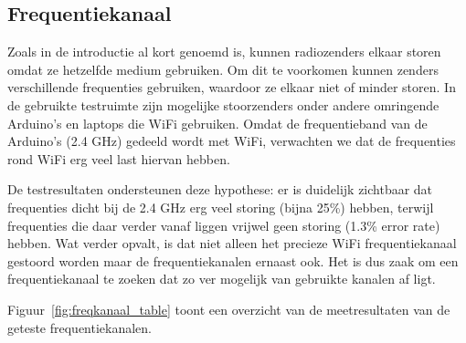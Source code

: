 \documentclass[a4paper,10pt]{article}
\begin{document}
\subsection{Frequentiekanaal}
Zoals in de introductie al kort genoemd is, kunnen radiozenders elkaar storen omdat ze hetzelfde medium gebruiken. Om dit te voorkomen kunnen zenders verschillende frequenties gebruiken, waardoor ze elkaar niet of minder storen. In de gebruikte testruimte zijn mogelijke stoorzenders onder andere omringende Arduino's en laptops die WiFi gebruiken. Omdat de frequentieband van de Arduino's (2.4 GHz) gedeeld wordt met WiFi, verwachten we dat de frequenties rond WiFi erg veel last hiervan hebben.

De testresultaten ondersteunen deze hypothese: er is duidelijk zichtbaar dat frequenties dicht bij de 2.4 GHz erg veel storing (bijna 25\%) hebben, terwijl frequenties die daar verder vanaf liggen vrijwel geen storing (1.3\% error rate) hebben. Wat verder opvalt, is dat niet alleen het precieze WiFi frequentiekanaal gestoord worden maar de frequentiekanalen ernaast ook. Het is dus zaak om een frequentiekanaal te zoeken dat zo ver mogelijk van gebruikte kanalen af ligt.

Figuur~\ref{fig:freqkanaal_table} toont een overzicht van de meetresultaten van de geteste frequentiekanalen.
\end{document}

